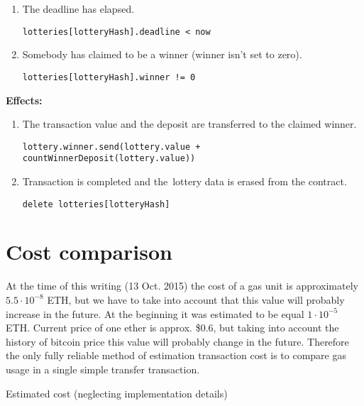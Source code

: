 \documentclass[a4paper]{article}
\begin{document}
\begin{enumerate}
            \begin{enumerate}
                \item The deadline has elapsed.
                    \begin{center}
		                \texttt{lotteries[lotteryHash].deadline < now}
		            \end{center}
                \item Somebody has claimed to be a winner (winner isn't set to zero).
                    \begin{center}
                        \texttt{lotteries[lotteryHash].winner != 0}
                    \end{center}
            \end{enumerate}
            \textbf{Effects:}
            \begin{enumerate}
                \item The transaction value and the deposit are transferred to the claimed winner.
                    \begin{center}
			            \texttt{lottery.winner.send(lottery.value + countWinnerDeposit(lottery.value))}
			        \end{center}
                \item Transaction is completed and the~lottery data is erased from the contract.
                    \begin{center}
                        \texttt{delete lotteries[lotteryHash]}
                    \end{center}
           \end{enumerate}
    \end{enumerate}
\section{Cost comparison}
\label{sec:cost}
    At the time of this writing (13 Oct. 2015) the cost of a gas unit is approximately  $5.5 \cdot 10^{-8}$ ETH, but
    we have to take into account that this value will probably increase in the future. At the beginning it was
    estimated to be equal $1 \cdot 10^{-5}$ ETH. Current price of one ether is approx. \$0.6, but taking into account
    the history of bitcoin price this value will probably change in the future. Therefore the only fully reliable
    method of estimation transaction cost is to compare gas usage in a single simple transfer transaction.

    Estimated cost (neglecting implementation details)
\end{document}
